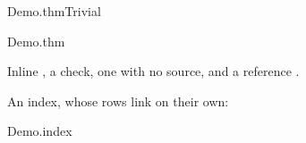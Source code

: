 \begin{leantheorem}{Demo.thm}{Trivial}
\end{leantheorem}

\begin{leanblock}[view=math]{Demo.thm}{}
\end{leanblock}

Inline , a check, one
with no source, and a reference .

An index, whose rows link on their own:
\begin{leanblock}[view=vocabulary]{Demo.index}{}
\end{leanblock}

